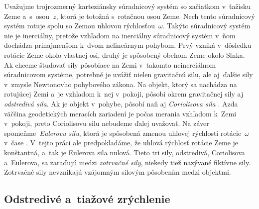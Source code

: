 \documentclass[a4paper,12pt]{book}
\begin{document}
Uvažujme trojrozmerný karteziánsky súradnicový systém so začiatkom v~ťažisku 
Zeme a~s~osou~$z$, ktorá je totožná s~rotačnou osou Zeme.  Nech tento 
súradnicový systém rotuje spolu so Zemou uhlovou rýchlosťou~$\omega$.  Takýto 
súradnicový systém nie je inerciálny, pretože vzhľadom na inerciálny 
súradnicový systém v~ňom dochádza prinajmenšom k~dvom nelineárnym pohybom.  
Prvý vzniká v~dôsledku rotácie Zeme okolo vlastnej osi, druhý je spôsobený 
obehom Zeme okolo Slnka.  Ak chceme študovať sily pôsobiace na Zemi v~takomto 
neinerciálnom súradnicovom systéme, potrebné je uvážiť nielen gravitačnú silu, 
ale aj~ďalšie sily v~zmysle Newtonovho pohybového zákona.  Na objekt, ktorý sa 
nachádza na rotujúcej Zemi a~je vzhľadom k~nej v~pokoji, pôsobí okrem 
gravitačnej sily aj \emph{odstredivá sila}.  Ak je objekt v~pohybe, pôsobí naň 
aj \emph{Coriolisova sila} \parencite{Torge1989,SansoGeoidDetermination}.  Azda 
väčšina geodetických meracích zariadení je počas merania vzhľadom k~Zemi 
v~pokoji, preto Coriolisovu silu nebudeme ďalej uvažovať.  Na záver 
spomeňme~\emph{Eulerovu silu}, ktorá je spôsobená zmenou uhlovej rýchlosti 
rotácie~$\omega$ v~čase \parencite{Torge1989,SansoGeoidDetermination}.  V~tejto 
práci ale predpokladáme, že uhlová rýchlosť rotácie Zeme je konštantná, a~tak 
je Eulerova sila nulová.  Tieto tri sily, odstredivá, Coriolisova a~Eulerova, 
sa zaraďujú medzi \emph{zotrvačné sily}, niekedy tiež nazývané fiktívne sily.  
Zotrvačné sily nevznikajú vzájomným silovým pôsobením medzi objektmi.






\subsection{Odstredivé a~tiažové zrýchlenie}
\label{sec:centrifugal_and_gravity_acceleration}
\end{document}
